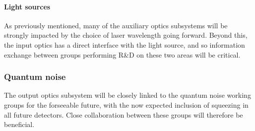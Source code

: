 \paragraph{\bf Light sources} As previously mentioned, many of the auxiliary optics subsystems will be strongly impacted by the choice of laser wavelength going forward. Beyond this, the input optics has a direct interface with the light source, and so information exchange between groups performing R\&D on these two areas will be critical.
\subsubsection{\bf Quantum noise} The output optics subsystem will be closely linked to the quantum noise working groups for the forseeable future, with the now expected inclusion of squeezing in all future detectors. Close collaboration between these groups will therefore be beneficial.
